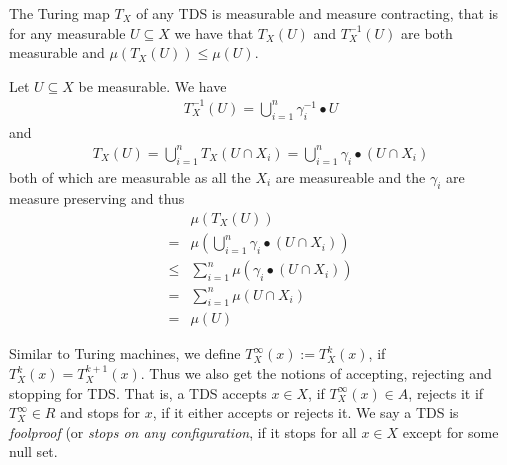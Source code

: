 \begin{Lemma} \label{tds:lemma_tx_measurable:lemma}
	The Turing map $T_X$ of any TDS is measurable and measure contracting, that is for any measurable $U \subseteq X$ we have that $T_X(U)$ and $T_X^{-1}(U)$ are both measurable and $\mu(T_X(U)) \leq \mu(U)$.
\end{Lemma}
\proof
Let $U \subseteq X$ be measurable. We have
\begin{align*}
	T_X^{-1}(U) = \bigcup_{i=1}^n \gamma_i^{-1} \bullet U
\end{align*}
and
\begin{align*}
	T_X(U) = \bigcup_{i=1}^n T_X(U \cap X_i) = \bigcup_{i=1}^n \gamma_i \bullet (U \cap X_i)
\end{align*}
both of which are measurable as all the $X_i$ are measureable and the $\gamma_i$ are measure preserving and thus
\begin{align*}
	&\mu(T_X(U)) \\
	= &\mu(\bigcup_{i=1}^n \gamma_i \bullet (U \cap X_i)) \\
	\leq &\sum_{i=1}^n \mu(\gamma_i \bullet (U \cap X_i)) \\
	= &\sum_{i=1}^n \mu(U \cap X_i) \\
	= &\mu(U)
\end{align*}
\endproof

Similar to Turing machines, we define $T_X^\infty(x):=T_X^k(x)$, if $T_X^k(x)=T_X^{k+1}(x)$. Thus we also get the notions of accepting, rejecting and stopping for TDS.
That is, a TDS accepts $x \in X$, if $T_X^\infty(x) \in A$,
rejects it if $T_X^\infty \in R$ 
and stops for $x$, if it either accepts or rejects it.
We say a TDS is \emph{foolproof} (or \emph{stops on any configuration}, if it stops for all $x \in X$ except for some null set.
